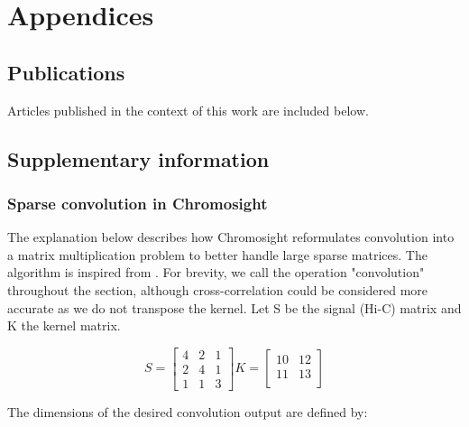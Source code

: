 \ctpartquote{}
\ctparttext{}
\part{Appendices}

\chapter{Publications}
 \label{ch:04-A:publications}
    Articles published in the context of this work are included below.

    

\chapter{Supplementary information}
\label{ch:04-B:supdata}

    \section{Sparse convolution in Chromosight}
    \label{sec:04-B-01:convolution}

The explanation below describes how Chromosight reformulates convolution into a matrix multiplication problem to better handle large sparse matrices. The algorithm is inspired from \cite{NeuralNetwork2D}. For brevity, we call the operation "convolution" throughout the section, although cross-correlation could be considered more accurate as we do not transpose the kernel. Let S be the signal (Hi-C) matrix and K the kernel matrix.

\begin{equation}
    S = 
    \begin{bmatrix}
        4 & 2 & 1 \\
        2 & 4 & 1 \\
        1 & 1 & 3
    \end{bmatrix}
    K =
    \begin{bmatrix}
        10 & 12 \\
        11 & 13 \\
    \end{bmatrix}
\end{equation}

The dimensions of the desired convolution output are defined by:

